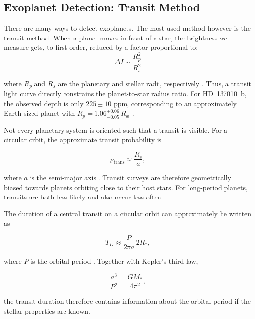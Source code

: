 \subsection{Exoplanet Detection: Transit Method}

There are many ways to detect exoplanets. The most used method however is the transit method. 
When a planet moves in front of a star, the brightness we measure gets, to first order, reduced by a factor proportional to:
\begin{equation}
    \Delta I \sim \frac{R_p^2}{R_s^2}
    \label{intensity}
\end{equation}


where $R_p$ and $R_s$ are the planetary and stellar radii, respectively \cite{exoplanet_script}. Thus, a transit light curve directly constrains the planet-to-star radius ratio. For HD~137010~b, the observed depth is only $225\pm10$ ppm, corresponding to an approximately Earth-sized planet with $R_p = 1.06^{+0.06}_{-0.05}\,R_\oplus$ \cite{venner2026}.

Not every planetary system is oriented such that a transit is visible. For a circular orbit, the approximate transit probability is

\begin{equation}
    p_{\mathrm{trans}}
    \approx
    \frac{R_s}{a},
    \label{eq:transit_probability}
\end{equation}

where $a$ is the semi-major axis \cite{exoplanet_script}. Transit surveys are therefore geometrically biased towards planets orbiting close to their host stars. For long-period planets, transits are both less likely and also occur less often.

The duration of a central transit on a circular orbit can approximately be written as

\begin{equation}
    T_D
    \approx
    \frac{P}{2\pi a}\,2R_*,
    \label{eq:transit_duration}
\end{equation}

where $P$ is the orbital period \cite{exoplanet_script}. Together with Kepler's third law,

\begin{equation}
    \frac{a^3}{P^2}
    =
    \frac{G M_*}{4\pi^2},
    \label{eq:kepler}
\end{equation}

the transit duration therefore contains information about the orbital period if the stellar properties are known.

